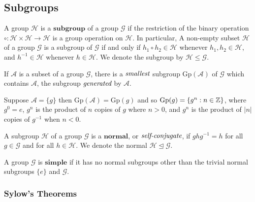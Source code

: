 
\subsection{Subgroups} %
\label{sec:subgroups}

\begin{defn}[Subgroup]
	A group $\mathcal{H}$ is a $\textbf{subgroup}$ of a group $\mathcal{G}$ if the restriction of the binary operation
	$\circ : \mathcal{H} \times \mathcal{H} \to \mathcal{H}$ is a group operation on $\mathcal{H}$.
	In particular, A non-empty subset $\mathcal{H}$ of a group $\mathcal{G}$ is a subgroup of
	$\mathcal{G}$ if and only if $h_1 \circ h_2 \in \mathcal{H}$ whenever $h_1, h_2 \in \mathcal{H}$,
	and $h^{-1} \in \mathcal{H}$ whenever $h \in \mathcal{H}$. We denote the subgroup by $\mathcal{H} \leq \mathcal{G}$.
\end{defn}

\begin{thm}
	If $\mathcal{A}$ is a subset of a group $\mathcal{G}$, there is a $\emph{smallest}$ subgroup
	$\mbox{Gp}(\mathcal{A})$ of $\mathcal{G}$ which contains $\mathcal{A}$, the subgroup $\emph{generated}$
	by $\mathcal{A}$.
\end{thm}

\begin{exmp}
	Suppose $\mathcal{A}=\{g\}$ then $\mbox{Gp}(\mathcal{A})=\mbox{Gp}(g)$ and so
	$\mbox{Gp}(g) = \{ g^n : n \in \mathbb{Z} \}$, where $g^0 = e$, $g^n$ is the product of $n$ copies of $g$
	where $n>0$, and $g^n$ is the product of $|n|$ copies of $g^{-1}$ when $n<0$.
\end{exmp}

\begin{defn}
	A subgroup $\mathcal{H}$ of a group $\mathcal{G}$ is a $\textbf{normal}$, or $\emph{self-conjugate}$, if
	$g h g^{-1} = h$ for all $g \in \mathcal{G}$ and for all $h \in \mathcal{H}$. We denote the normal
	$\mathcal{H} \unlhd \mathcal{G}$.
\end{defn}

\begin{defn}
	A group $\mathcal{G}$ is $\textbf{simple}$ if it has no normal subgroups other than the trivial normal
	subgroups $\{e\}$ and $\mathcal{G}$.
\end{defn}


\subsubsection{Sylow's Theorems}

